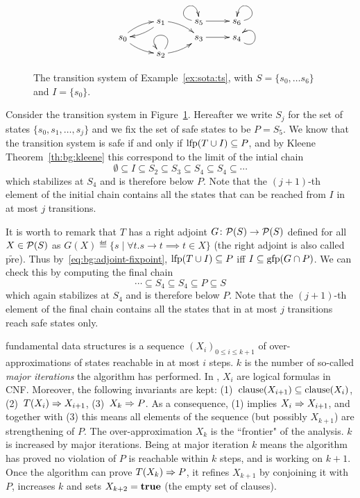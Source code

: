 \begin{example}\label{ex:sota:ts}
	\begin{figure}[t]
		\begin{displaymath}
			\xymatrix@R=5pt{
			& s_1 \ar@/^1ex/[rd] \ar@/^1ex/[ld] &  s_5 \ar@(l,u)\ar[r] & s_6 \ar@(r,u)\\
			s_0 \ar@/^1ex/[ur] \ar@/_1ex/[rd] & &s_3 \ar[r]& s_4\ar@(rd,ur) \\
			& s_2 \ar@(ur,ul) \ar@/_1ex/[ru] &
			}
		\end{displaymath}
		\caption{The transition system of Example~\ref{ex:sota:ts}, with $S = \{ s_0, \dots s_6 \}$ and $I=\{s_0\}$.}\label{fig:sota:ts}
	\end{figure}

	Consider the transition system in Figure~\ref{fig:sota:ts}. Hereafter we write $S_{j}$ for the set of states $\{s_0, s_1, \dots, s_j\}$ and we fix the set of safe states to be $P = S_5$.
	We know that the transition system is safe if and only if $\text{lfp}(T \cup I) \subseteq P$, and by Kleene Theorem~\ref{th:bg:kleene} this correspond to the limit of the intial chain
	\[
	\emptyset \subseteq  I \subseteq S_2 \subseteq S_3 \subseteq S_4 \subseteq S_4 \subseteq \cdots
	\]
	which stabilizes at $S_4$ and is therefore below $P$. Note that the $(j+1)$-th element of the initial chain contains all the states that can be reached from $I$ in at most $j$ transitions.

	It is worth to remark that $T$ has a right adjoint $G \colon \mathcal{P}(S) \to \mathcal{P}(S)$ defined for all $X \in \mathcal{P}(S)$ as $G(X) \eqdef \{s \mid \forall t. s \rightarrow t \implies t \in X \}$ (the right adjoint is also called $\widetilde{\text{pre}}$). Thus by~\eqref{eq:bg:adjoint-fixpoint}, $\text{lfp} (T \cup I) \subseteq P$ iff $I \subseteq \text{gfp} (G \cap P)$. We can check this by computing the final chain
	\[
	\cdots \subseteq S_4 \subseteq S_4 \subseteq P \subseteq S
	\]
	which again stabilizes at $S_4$ and is therefore below $P$. Note that the $(j+1)$-th element of the final chain contains all the states that in at most $j$ transitions reach safe states only.
\end{example}

 fundamental data structures is a sequence $(X_i)_{0 \le i \le k + 1}$ of over-approximations of states reachable in at most $i$ steps. $k$ is the number of so-called \emph{major iterations} the algorithm has performed.
In , $X_i$ are logical formulas in CNF. Moreover, the following invariants are kept: (1)~$\text{clause}(X_{i+1}) \subseteq \text{clause}(X_i)$, (2)~$T(X_i) \Rightarrow X_{i+1}$, (3)~$X_{k} \Rightarrow P$.
As a consequence, (1) implies $X_i \Rightarrow X_{i+1}$, and together with (3) this means all elements of the sequence (but possibly $X_{k+1}$) are strengthening of $P$. The over-approximation $X_k$ is the ``frontier" of the analysis. $k$ is increased by major iterations. Being at major iteration $k$ means the algorithm has proved no violation of $P$ is reachable within $k$ steps, and is working on $k + 1$. Once the algorithm can prove $T(X_k) \Rightarrow P$, it refines $X_{k+1}$ by conjoining it with $P$, increases $k$ and sets $X_{k+2} = \textbf{true}$ (the empty set of clauses).

